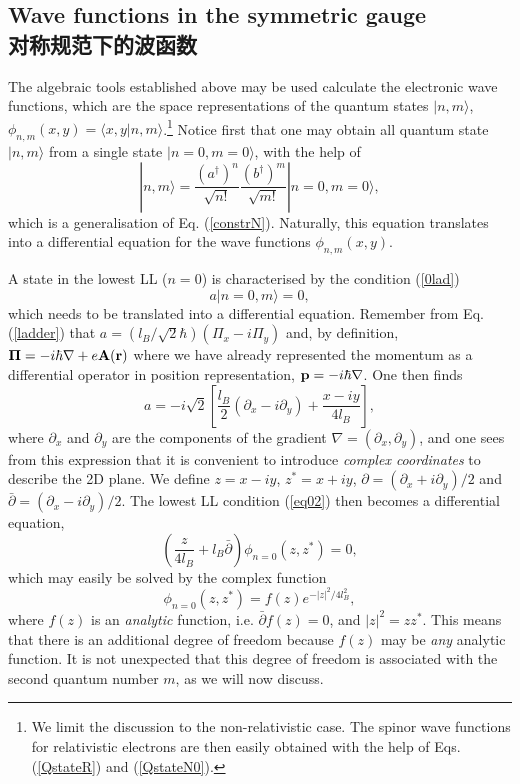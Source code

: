 \documentclass[10pt]{book}
\newcommand{\Pib}{\mbox{\boldmath $\Pi $}}
\newcommand{\bp}{{\bf p}}
\newcommand{\br}{{\bf r}}
\newcommand{\bA}{{\bf A}}
\newcommand{\beq}{\begin{equation}}
\newcommand{\eeq}{\end{equation}}
\begin{document}
\subsection[对称规范下的波函数]{Wave functions in the symmetric gauge\\\bf 对称规范下的波函数}
\label{WFsym}

The algebraic tools established above may be used calculate the electronic wave functions, which
are the space representations of the quantum states $|n,m\rangle$, $\phi_{n,m}(x,y)=\langle x,y|n,m\rangle$.\footnote{
We limit the discussion to the non-relativistic case. The spinor wave functions for relativistic electrons are then easily
obtained with the help of Eqs. (\ref{QstateR}) and (\ref{QstateN0}).}
Notice first that one may obtain all quantum state $|n,m\rangle$ from a single state $|n=0,m=0\rangle$, with the help
of 
\beq\label{constrNM}
|n,m\rangle = \frac{\left(a^{\dagger}\right)^n}{\sqrt{n!}} \frac{\left(b^{\dagger}\right)^m}{\sqrt{m!}}|n=0,m=0\rangle,
\eeq
which is a generalisation of Eq. (\ref{constrN}). Naturally, this equation translates into a differential equation for the
wave functions $\phi_{n,m}(x,y)$.

A state in the lowest LL ($n=0$) is characterised by the condition (\ref{0lad})
\beq\label{eq02}
a |n=0,m\rangle = 0,
\eeq
which needs to be translated into a differential equation. Remember from Eq. (\ref{ladder}) that
$a = (l_B/\sqrt{2}\hbar)(\Pi_x - i\Pi_y)$ and, by definition, $\Pib= -i\hbar\nabla + e\bA(\br)$ where we have 
already represented the momentum as a differential operator in position representation, $\bp=-i\hbar\nabla$.
One then finds 
$$a=-i\sqrt{2}\left[\frac{l_B}{2}\left(\partial_x - i\partial_y\right)+\frac{x-iy}{4l_B}\right],$$
where $\partial_x$ and $\partial_y$ are the components of the gradient $\nabla=(\partial_x,\partial_y)$,
and one sees from this expression that it is convenient to introduce {\sl complex coordinates} to describe the 2D plane. We define
$z=x-iy$, $z^*=x+iy$, $\partial = (\partial_x + i\partial_y)/2$ and $\bar{\partial} = (\partial_x - i\partial_y)/2$.
The lowest LL condition (\ref{eq02}) then becomes a differential equation,
\beq\label{eq03}
\left(\frac{z}{4 l_B} + l_B\bar{\partial}\right) \phi_{n=0}(z,z^*) = 0,
\eeq
which may easily be solved by the complex function
\beq\label{eq04}
\phi_{n=0}(z,z^*) = f(z) e^{-|z|^2/4l_B^2},
\eeq
where $f(z)$ is an {\sl analytic} function, i.e. $\bar{\partial} f(z) = 0$, and $|z|^2=zz^*$. 
This means that there is an additional degree of freedom because 
$f(z)$ may be {\sl any} analytic function. It is not unexpected that this degree of freedom is associated with the second 
quantum number $m$, as we will now discuss.
\end{document}
